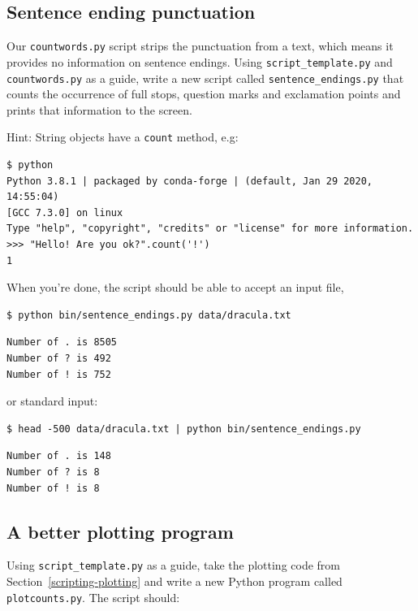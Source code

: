 \documentclass[
]{krantz}
\begin{document}
\hypertarget{scripting-ex-sentence-endings}{%
\subsection{Sentence ending punctuation}\label{scripting-ex-sentence-endings}}

Our \texttt{countwords.py} script strips the punctuation from a text,
which means it provides no information on sentence endings.
Using \texttt{script\_template.py} and \texttt{countwords.py} as a guide,
write a new script called \texttt{sentence\_endings.py} that counts
the occurrence of full stops, question marks and exclamation points
and prints that information to the screen.

Hint: String objects have a \texttt{count} method, e.g:

\begin{verbatim}
$ python
Python 3.8.1 | packaged by conda-forge | (default, Jan 29 2020, 14:55:04)
[GCC 7.3.0] on linux
Type "help", "copyright", "credits" or "license" for more information.
>>> "Hello! Are you ok?".count('!')
1
\end{verbatim}

When you're done,
the script should be able to accept an input file,

\begin{verbatim}
$ python bin/sentence_endings.py data/dracula.txt
\end{verbatim}

\begin{verbatim}
Number of . is 8505
Number of ? is 492
Number of ! is 752
\end{verbatim}

or standard input:

\begin{verbatim}
$ head -500 data/dracula.txt | python bin/sentence_endings.py
\end{verbatim}

\begin{verbatim}
Number of . is 148
Number of ? is 8
Number of ! is 8
\end{verbatim}

\hypertarget{scripting-ex-better-plotting}{%
\subsection{A better plotting program}\label{scripting-ex-better-plotting}}

Using \texttt{script\_template.py} as a guide,
take the plotting code from Section~\ref{scripting-plotting}
and write a new Python program called \texttt{plotcounts.py}.
The script should:
\end{document}
